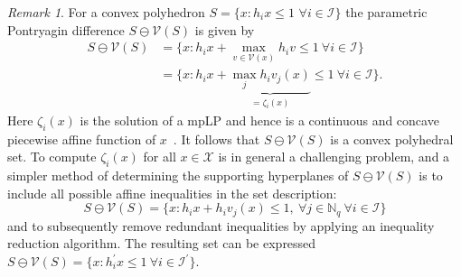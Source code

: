 \documentclass[journal]{IEEEtran}
\newcounter{thmcount}
\theoremstyle{remark}
\newtheorem{rem}[thmcount]{Remark}
\theoremstyle{definition}
\begin{document}
\begin{rem}\label{rem:pPdiff:calculation}
For a convex polyhedron $S=\{x : h_i x \leq 1$ $\forall i \in\mathcal{I} \}$ the parametric Pontryagin difference $S \ominus \mathcal{V}(S)$ is given by
%
%
\begin{align*}
S \ominus \mathcal{V}(S) 
&= \{x : h_i x + \max_{v\in \mathcal{V}(x)} h_i v \leq 1 
\ \forall i \in\mathcal{I} \}\\
&= \{x : h_i x + \underbrace{\max_{j} h_i v_j(x)}_{=\zeta_i(x)} \leq 1 
\ \forall i \in\mathcal{I}\} .
\end{align*}
Here $\zeta_i(x)$ is the solution of a mpLP and hence is a continuous and concave piecewise affine function of $x$~\cite{Gal:1995}. It follows that $S\ominus\mathcal{V}(S)$ is a convex polyhedral set.
%
To compute $\zeta_i(x)$ for all $x\in\mathcal X$ is in general a challenging problem, and a simpler method of determining the supporting hyperplanes of $S\ominus\mathcal{V}(S)$ is to include all possible affine inequalities in the set description:
\[
S\ominus\mathcal{V}(S) = \{ x : h_ix + h_i v_j(x) \leq 1, \ \forall j\in\mathbb{N}_q\ \forall i\in \mathcal I\}
\] 
and to subsequently remove redundant inequalities by applying an inequality reduction algorithm. 
The resulting set can be expressed $S\ominus \mathcal{V}(S) = \{ x : h_i^\prime x \leq 1 \ \forall i \in \mathcal{I}^\prime \}$.%
\end{rem}
%
\end{document}
